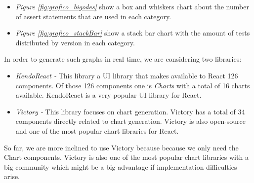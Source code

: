 \documentclass[runningheads]{llncs}
\begin{document}
\begin{itemize}
\item \emph{Figure \ref{fig:grafico_bigodes}} show a box and whiskers chart about the number of assert statements that are used in each category.
\item \emph{Figure \ref{fig:grafico_stackBar}} show a stack bar chart with the amount of tests distributed by version in each category.
\end{itemize}

In order to generate such graphs in real time, we are considering two libraries:

\begin{itemize}
\item \emph{KendoReact\cite{KendoReact} -} This library a UI library that makes available to React 126 components. Of those 126 components one is \emph{Charts} with a total of 16 charts available. KendoReact is a very popular UI library for React.
\item \emph{Victory\cite{Victory} -} This library focuses on chart generation. Victory has a total of 34 components directly related to chart generation. Victory is also open-source and one of the most popular chart libraries for React.
\end{itemize}

So far, we are more inclined to use Victory because because we only need the Chart components. Victory is also one of the most popular chart libraries with a big community which might be a big advantage if implementation difficulties arise.
\end{document}
